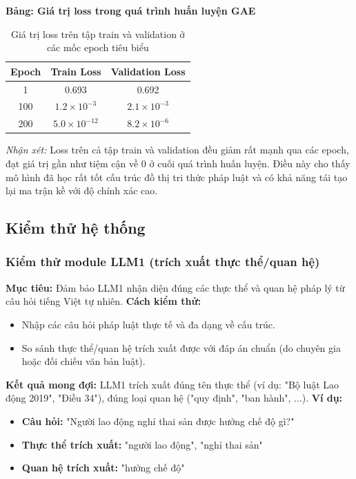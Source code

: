 \documentclass[a4paper]{article}
\begin{document}
\textbf{Bảng: Giá trị loss trong quá trình huấn luyện GAE}

\begin{table}[H]
\centering
\begin{tabular}{|c|c|c|}
\hline
\textbf{Epoch} & \textbf{Train Loss} & \textbf{Validation Loss} \\
\hline
1   & 0.693 & 0.692 \\
100 & $1.2 \times 10^{-3}$ & $2.1 \times 10^{-3}$ \\
200 & $5.0 \times 10^{-12}$ & $8.2 \times 10^{-6}$ \\
\hline
\end{tabular}
\caption{Giá trị loss trên tập train và validation ở các mốc epoch tiêu biểu}
\end{table}

\textit{Nhận xét:} Loss trên cả tập train và validation đều giảm rất mạnh qua các epoch, đạt giá trị gần như tiệm cận về 0 ở cuối quá trình huấn luyện. Điều này cho thấy mô hình đã học rất tốt cấu trúc đồ thị tri thức pháp luật và có khả năng tái tạo lại ma trận kề với độ chính xác cao.

\subsection{Kiểm thử hệ thống}
\subsubsection{Kiểm thử module LLM1 (trích xuất thực thể/quan hệ)}
\textbf{Mục tiêu:} Đảm bảo LLM1 nhận diện đúng các thực thể và quan hệ pháp lý từ câu hỏi tiếng Việt tự nhiên.
\textbf{Cách kiểm thử:}
\begin{itemize}
\item Nhập các câu hỏi pháp luật thực tế và đa dạng về cấu trúc.
\item So sánh thực thể/quan hệ trích xuất được với đáp án chuẩn (do chuyên gia hoặc đối chiếu văn bản luật).
\end{itemize}
\textbf{Kết quả mong đợi:} LLM1 trích xuất đúng tên thực thể (ví dụ: "Bộ luật Lao động 2019", "Điều 34"), đúng loại quan hệ ("quy định", "ban hành", ...).
\textbf{Ví dụ:}
\begin{itemize}
\item \textbf{Câu hỏi:} "Người lao động nghỉ thai sản được hưởng chế độ gì?"
\item \textbf{Thực thể trích xuất:} "người lao động", "nghỉ thai sản"
\item \textbf{Quan hệ trích xuất:} "hưởng chế độ"
\end{itemize}
\end{document}
